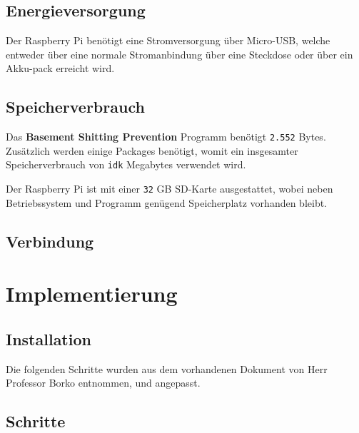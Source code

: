 \subsection{Energieversorgung}

Der Raspberry Pi benötigt eine Stromversorgung über Micro-USB, welche entweder über eine normale Stromanbindung über eine Steckdose oder über ein Akku-pack erreicht wird.
\subsection{Speicherverbrauch}

Das \textbf{Basement Shitting Prevention} Programm benötigt \texttt{2.552} Bytes. Zusätzlich werden einige Packages benötigt, womit ein insgesamter Speicherverbrauch von \texttt{idk} Megabytes verwendet wird.

Der Raspberry Pi ist mit einer \texttt{32} GB SD-Karte ausgestattet, wobei neben Betriebssystem und Programm genügend Speicherplatz vorhanden bleibt.

\subsection{Verbindung}




\clearpage
\section{Implementierung}

\subsection{Installation}

Die folgenden Schritte wurden aus dem vorhandenen Dokument von Herr Professor Borko entnommen, und angepasst.

\subsection{Schritte}

